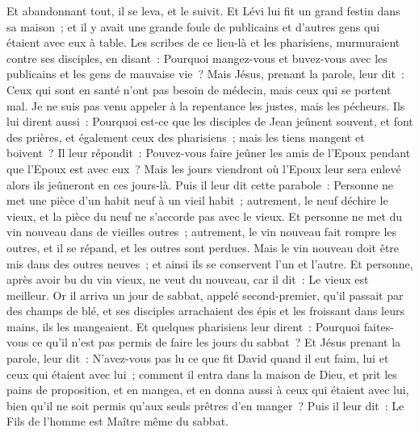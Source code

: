 \begin{multicols}{2}
Et abandonnant tout, il se leva, et le suivit.
Et Lévi lui fit un grand festin dans sa maison~; et il y avait une grande foule de publicains et d'autres gens qui étaient avec eux à table.
Les scribes de ce lieu-là et les pharisiens, murmuraient contre ses disciples, en disant~: Pourquoi mangez-vous et buvez-vous avec les publicains et les gens de mauvaise vie~?
Mais Jésus, prenant la parole, leur dit~: Ceux qui sont en santé n'ont pas besoin de médecin, mais ceux qui se portent mal.
Je ne suis pas venu appeler à la repentance les justes, mais les pécheurs.
Ils lui dirent aussi~: Pourquoi est-ce que les disciples de Jean jeûnent souvent, et font des prières, et également ceux des pharisiens~; mais les tiens mangent et boivent~?
Il leur répondit~: Pouvez-vous faire jeûner les amis de l'Epoux pendant que l'Epoux est avec eux~?
Mais les jours viendront où l'Epoux leur sera enlevé alors ils jeûneront en ces jours-là.
Puis il leur dit cette parabole~: Personne ne met une pièce d'un habit neuf à un vieil habit~; autrement, le neuf déchire le vieux, et la pièce du neuf ne s'accorde pas avec le vieux.
Et personne ne met du vin nouveau dans de vieilles outres~; autrement, le vin nouveau fait rompre les outres, et il se répand, et les outres sont perdues.
Mais le vin nouveau doit être mis dans des outres neuves~; et ainsi ils se conservent l'un et l'autre.
Et personne, après avoir bu du vin vieux, ne veut du nouveau, car il dit~: Le vieux est meilleur.
\VerseOne{}Or il arriva un jour de sabbat, appelé second-premier, qu'il passait par des champs de blé, et ses disciples arrachaient des épis et les froissant dans leurs mains, ils les mangeaient.
Et quelques pharisiens leur dirent~: Pourquoi faites-vous ce qu'il n'est pas permis de faire les jours du sabbat~?
Et Jésus prenant la parole, leur dit~: N'avez-vous pas lu ce que fit David quand il eut faim, lui et ceux qui étaient avec lui~;
comment il entra dans la maison de Dieu, et prit les pains de proposition, et en mangea, et en donna aussi à ceux qui étaient avec lui, bien qu'il ne soit permis qu'aux seuls prêtres d'en manger~?
Puis il leur dit~: Le Fils de l'homme est Maître même du sabbat.

\end{multicols}
